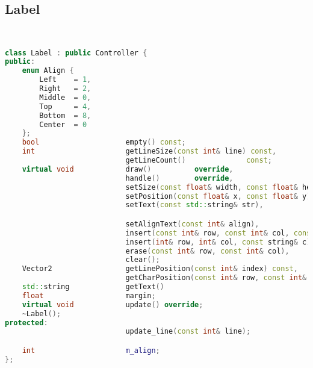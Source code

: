 \subsection{Label}
\begin{lstlisting}[language=C++]


class Label : public Controller {
public:
    enum Align {
        Left    = 1,
        Right   = 2,
        Middle  = 0,
        Top     = 4,
        Bottom  = 8,
        Center  = 0
    };
    bool                    empty() const;
    int                     getLineSize(const int& line) const,
                            getLineCount()              const;
    virtual void            draw()          override,
                            handle()        override,
                            setSize(const float& width, const float& height) override,
                            setPosition(const float& x, const float& y) override,
                            setText(const std::string& str),

                            setAlignText(const int& align),
                            insert(const int& row, const int& col, const char& c),
                            insert(int& row, int& col, const string& c),
                            erase(const int& row, const int& col),
                            clear();
    Vector2                 getLinePosition(const int& index) const,
                            getCharPosition(const int& row, const int& col) const;
    std::string             getText()                                           const,
    float                   margin;
    virtual void            update() override;
    ~Label();
protected:
                            update_line(const int& line);

    int                     m_align;
};






\end{lstlisting}
